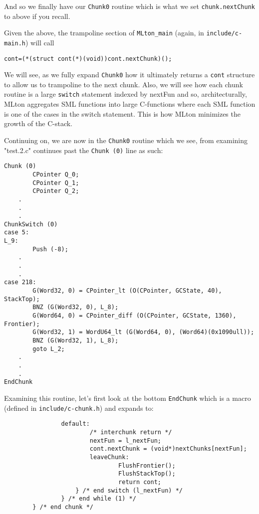 And so we finally have our \texttt{Chunk0} routine which is what we set \texttt{chunk.nextChunk} to above if you recall.





Given the above, the trampoline section of \texttt{MLton\_main} (again, in \texttt{include/c-main.h}) will call


\begin{minipage}{\linewidth}
\lstset{language=C}\begin{lstlisting}
cont=(*(struct cont(*)(void))cont.nextChunk)(); 
\end{lstlisting}
\end{minipage}

We will see, as we fully expand \texttt{Chunk0} how it ultimately returns a \texttt{cont} structure to allow us to trampoline to the next chunk. Also, we will see how each chunk routine is a large \texttt{switch} statement indexed by nextFun and so, architecturally, MLton aggregates SML functions into large C-functions where each SML function is one of the cases in the switch statement. This is how MLton minimizes the growth of the C-stack.

Continuing on, we are now in the \texttt{Chunk0} routine which we see, from examining "test.2.c" continues past the \texttt{Chunk (0)} line as such:

\begin{minipage}{\linewidth}
\lstset{language=C}\begin{lstlisting}
Chunk (0)
        CPointer Q_0;
        CPointer Q_1;
        CPointer Q_2;
	.
	.
	.
ChunkSwitch (0)
case 5:
L_9:
        Push (-8);
	.
	.
	.
case 218:
        G(Word32, 0) = CPointer_lt (O(CPointer, GCState, 40), StackTop);
        BNZ (G(Word32, 0), L_8);
        G(Word64, 0) = CPointer_diff (O(CPointer, GCState, 1360), Frontier);
        G(Word32, 1) = WordU64_lt (G(Word64, 0), (Word64)(0x1090ull));
        BNZ (G(Word32, 1), L_8);
        goto L_2;
	.
	.
	.
EndChunk
\end{lstlisting}
\end{minipage}

Examining this routine, let's first look at the bottom \texttt{EndChunk} which is a macro (defined in \texttt{include/c-chunk.h}) and expands to:

\begin{minipage}{\linewidth}
\lstset{language=C}\begin{lstlisting}
                default:
                        /* interchunk return */
                        nextFun = l_nextFun;
                        cont.nextChunk = (void*)nextChunks[nextFun];
                        leaveChunk:
                                FlushFrontier();
                                FlushStackTop();
                                return cont;
                    } /* end switch (l_nextFun) */
                } /* end while (1) */
        } /* end chunk */	
\end{lstlisting}
\end{minipage}


